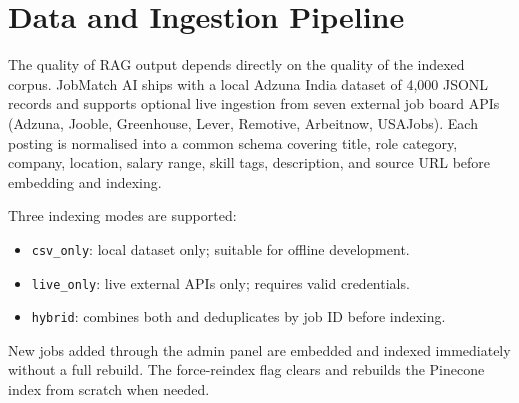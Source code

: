 \documentclass[11pt]{article}
\begin{document}
\begin{center}
\end{center}
\vspace{2pt}
\vspace{6pt}

\section{Data and Ingestion Pipeline}

The quality of RAG output depends directly on the quality of the indexed corpus. JobMatch AI ships with a local Adzuna India dataset of 4,000 JSONL records and supports optional live ingestion from seven external job board APIs (Adzuna, Jooble, Greenhouse, Lever, Remotive, Arbeitnow, USAJobs). Each posting is normalised into a common schema covering title, role category, company, location, salary range, skill tags, description, and source URL before embedding and indexing.

Three indexing modes are supported:

\begin{itemize}
  \item \texttt{csv\_only}: local dataset only; suitable for offline development.
  \item \texttt{live\_only}: live external APIs only; requires valid credentials.
  \item \texttt{hybrid}: combines both and deduplicates by job ID before indexing.
\end{itemize}

New jobs added through the admin panel are embedded and indexed immediately without a full rebuild. The force-reindex flag clears and rebuilds the Pinecone index from scratch when needed.
\end{document}
